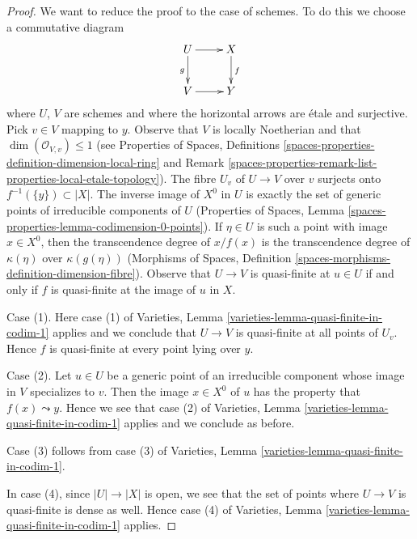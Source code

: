 \documentclass{stacks-project}
\theoremstyle{plain}
\theoremstyle{definition}
\theoremstyle{remark}
\numberwithin{equation}{subsection}
\begin{document}
\begin{proof}
We want to reduce the proof to the case of schemes. To do this we
choose a commutative diagram
$$
\xymatrix{
U \ar[r] \ar[d]_g & X \ar[d]^f \\
V \ar[r] & Y
}
$$
where $U$, $V$ are schemes and where the horizontal arrows are \'etale
and surjective. Pick $v \in V$ mapping to $y$. Observe that
$V$ is locally Noetherian and that $\dim(\mathcal{O}_{V, v}) \leq 1$
(see Properties of Spaces, Definitions
\ref{spaces-properties-definition-dimension-local-ring} and
Remark \ref{spaces-properties-remark-list-properties-local-etale-topology}).
The fibre $U_v$ of $U \to V$ over $v$ surjects onto
$f^{-1}(\{y\}) \subset |X|$. The inverse image of $X^0$ in $U$
is exactly the set of
generic points of irreducible components of $U$ (Properties of Spaces, Lemma
\ref{spaces-properties-lemma-codimension-0-points}).
If $\eta \in U$ is such a point with image $x \in X^0$, then
the transcendence degree of $x / f(x)$ is the transcendence
degree of $\kappa(\eta)$ over $\kappa(g(\eta))$
(Morphisms of Spaces, Definition
\ref{spaces-morphisms-definition-dimension-fibre}).
Observe that $U \to V$ is quasi-finite at $u \in U$ if and only if
$f$ is quasi-finite at the image of $u$ in $X$.

\medskip\noindent
Case (1). Here case (1) of
Varieties, Lemma \ref{varieties-lemma-quasi-finite-in-codim-1} applies
and we conclude that $U \to V$ is quasi-finite at all points of $U_v$.
Hence $f$ is quasi-finite at every point lying over $y$.

\medskip\noindent
Case (2). Let $u \in U$ be a generic point of an irreducible component
whose image in $V$ specializes to $v$. Then the image $x \in X^0$ of
$u$ has the property that $f(x) \leadsto y$. Hence we see that
case (2) of
Varieties, Lemma \ref{varieties-lemma-quasi-finite-in-codim-1} applies
and we conclude as before.

\medskip\noindent
Case (3) follows from case (3) of
Varieties, Lemma \ref{varieties-lemma-quasi-finite-in-codim-1}.

\medskip\noindent
In case (4), since $|U| \to |X|$ is open, we see that
the set of points where $U \to V$ is quasi-finite is dense as well.
Hence case (4) of
Varieties, Lemma \ref{varieties-lemma-quasi-finite-in-codim-1} applies.
\end{proof}
\end{document}
